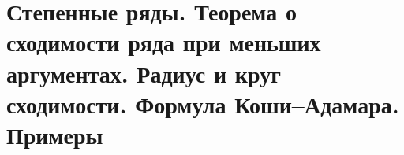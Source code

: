 \section{Степенные ряды. Теорема о сходимости ряда при меньших аргументах. Радиус и круг сходимости. Формула Коши–Адамара. Примеры}
